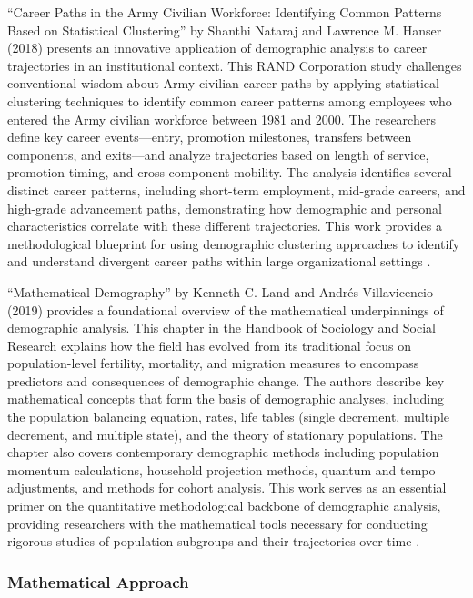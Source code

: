 \documentclass[../main.tex]{subfiles}
\begin{document}
 ``Career Paths in the Army Civilian Workforce: Identifying Common Patterns Based on Statistical Clustering'' by Shanthi Nataraj and Lawrence M. Hanser (2018) presents an innovative application of demographic analysis to career trajectories in an institutional context. This RAND Corporation study challenges conventional wisdom about Army civilian career paths by applying statistical clustering techniques to identify common career patterns among employees who entered the Army civilian workforce between 1981 and 2000. The researchers define key career events—entry, promotion milestones, transfers between components, and exits—and analyze trajectories based on length of service, promotion timing, and cross-component mobility. The analysis identifies several distinct career patterns, including short-term employment, mid-grade careers, and high-grade advancement paths, demonstrating how demographic and personal characteristics correlate with these different trajectories. This work provides a methodological blueprint for using demographic clustering approaches to identify and understand divergent career paths within large organizational settings \citep{nataraj2018career}.

 ``Mathematical Demography'' by Kenneth C. Land and Andrés Villavicencio (2019) provides a foundational overview of the mathematical underpinnings of demographic analysis. This chapter in the Handbook of Sociology and Social Research explains how the field has evolved from its traditional focus on population-level fertility, mortality, and migration measures to encompass predictors and consequences of demographic change. The authors describe key mathematical concepts that form the basis of demographic analyses, including the population balancing equation, rates, life tables (single decrement, multiple decrement, and multiple state), and the theory of stationary populations. The chapter also covers contemporary demographic methods including population momentum calculations, household projection methods, quantum and tempo adjustments, and methods for cohort analysis. This work serves as an essential primer on the quantitative methodological backbone of demographic analysis, providing researchers with the mathematical tools necessary for conducting rigorous studies of population subgroups and their trajectories over time \citep{land2019mathematical}.

\subsubsection{Mathematical Approach}
\end{document}
